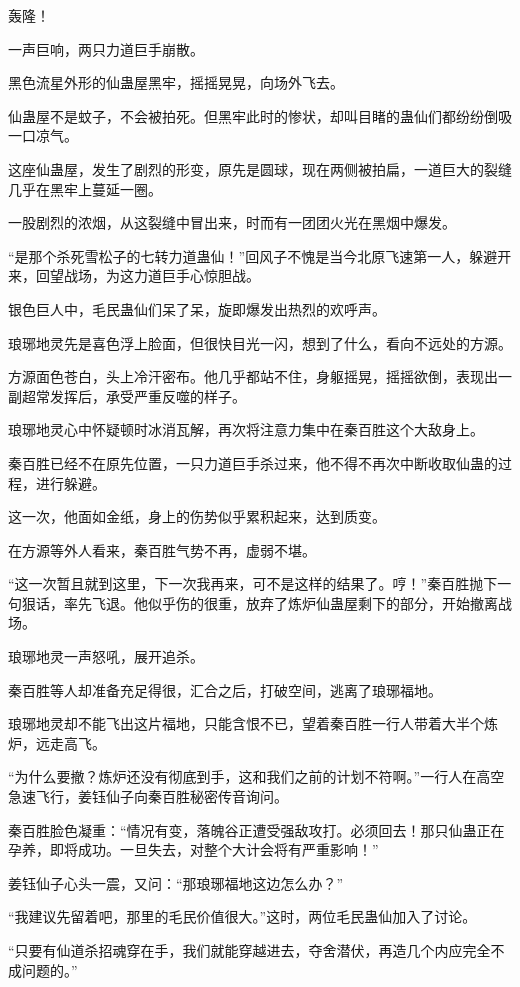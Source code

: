 \begin{this_body}
轰隆！

一声巨响，两只力道巨手崩散。

黑色流星外形的仙蛊屋黑牢，摇摇晃晃，向场外飞去。

仙蛊屋不是蚊子，不会被拍死。但黑牢此时的惨状，却叫目睹的蛊仙们都纷纷倒吸一口凉气。

这座仙蛊屋，发生了剧烈的形变，原先是圆球，现在两侧被拍扁，一道巨大的裂缝几乎在黑牢上蔓延一圈。

一股剧烈的浓烟，从这裂缝中冒出来，时而有一团团火光在黑烟中爆发。

“是那个杀死雪松子的七转力道蛊仙！”回风子不愧是当今北原飞速第一人，躲避开来，回望战场，为这力道巨手心惊胆战。

银色巨人中，毛民蛊仙们呆了呆，旋即爆发出热烈的欢呼声。

琅琊地灵先是喜色浮上脸面，但很快目光一闪，想到了什么，看向不远处的方源。

方源面色苍白，头上冷汗密布。他几乎都站不住，身躯摇晃，摇摇欲倒，表现出一副超常发挥后，承受严重反噬的样子。

琅琊地灵心中怀疑顿时冰消瓦解，再次将注意力集中在秦百胜这个大敌身上。

秦百胜已经不在原先位置，一只力道巨手杀过来，他不得不再次中断收取仙蛊的过程，进行躲避。

这一次，他面如金纸，身上的伤势似乎累积起来，达到质变。

在方源等外人看来，秦百胜气势不再，虚弱不堪。

“这一次暂且就到这里，下一次我再来，可不是这样的结果了。哼！”秦百胜抛下一句狠话，率先飞退。他似乎伤的很重，放弃了炼炉仙蛊屋剩下的部分，开始撤离战场。

琅琊地灵一声怒吼，展开追杀。

秦百胜等人却准备充足得很，汇合之后，打破空间，逃离了琅琊福地。

琅琊地灵却不能飞出这片福地，只能含恨不已，望着秦百胜一行人带着大半个炼炉，远走高飞。

“为什么要撤？炼炉还没有彻底到手，这和我们之前的计划不符啊。”一行人在高空急速飞行，姜钰仙子向秦百胜秘密传音询问。

秦百胜脸色凝重：“情况有变，落魄谷正遭受强敌攻打。必须回去！那只仙蛊正在孕养，即将成功。一旦失去，对整个大计会将有严重影响！”

姜钰仙子心头一震，又问：“那琅琊福地这边怎么办？”

“我建议先留着吧，那里的毛民价值很大。”这时，两位毛民蛊仙加入了讨论。

“只要有仙道杀招魂穿在手，我们就能穿越进去，夺舍潜伏，再造几个内应完全不成问题的。”


\end{this_body}
